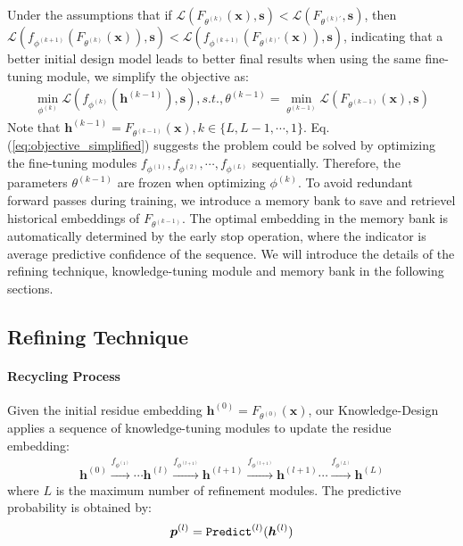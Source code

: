 \documentclass{article}
\begin{document}
Under the assumptions that if $\mathcal{L}(F_{\theta^{(k)}}(\boldsymbol{x}), \boldsymbol{s})<\mathcal{L}(F_{\theta^{(k)'}}, \boldsymbol{s})$, then $\mathcal{L}(f_{\phi^{(k+1)}}(F_{\theta^{(k)}}(\boldsymbol{x})), \boldsymbol{s})<\mathcal{L}(f_{\phi^{(k+1)}}(F_{\theta^{(k)'}}(\boldsymbol{x})), \boldsymbol{s})$, indicating that a better initial design model leads to better final results when using the same fine-tuning module, we simplify the objective as:
\begin{align}
    \min_{\phi^{(k)}} \mathcal{L}(f_{\phi^{(k)}}(\boldsymbol{h}^{(k-1)}), \boldsymbol{s}), s.t., \theta^{(k-1)} = \min_{\theta^{(k-1)}} \mathcal{L}(F_{\theta^{(k-1)}}(\boldsymbol{x}), \boldsymbol{s})
    \label{eq:objective_simplified}
\end{align}
Note that $\boldsymbol{h}^{(k-1)} = F_{\theta^{(k-1)}}(\boldsymbol{x}),  k \in \{L, L-1, \cdots, 1\}$. Eq.(\ref{eq:objective_simplified}) suggests the problem could be solved by optimizing the fine-tuning modules $f_{\phi^{(1)}}, f_{\phi^{(2)}}, \cdots, f_{\phi^{(L)}}$ sequentially. Therefore, the parameters $\theta^{(k-1)}$ are frozen when optimizing $\phi^{(k)}$. To avoid redundant forward passes during training, we introduce a memory bank to save and retrievel historical embeddings of $F_{\theta^{(k-1)}}$. The optimal embedding in the memory bank is automatically determined by the early stop operation, where the indicator is average predictive confidence of the sequence. We will introduce the details of the refining technique, knowledge-tuning module and memory bank in the following sections.







\subsection{Refining Technique}
\label{sec:recycling}
\paragraph{Recycling Process} Given the initial residue embedding $\boldsymbol{h}^{(0)} = F_{\theta^{(0)}}(\boldsymbol{x})$, our Knowledge-Design applies a sequence of knowledge-tuning modules to update the residue embedding:
\begin{align}
    \boldsymbol{h}^{(0)} \xrightarrow{f_{\phi^{(1)}}} \cdots \boldsymbol{h}^{(l)} \xrightarrow{f_{\phi^{(l+1)}}} \boldsymbol{h}^{(l+1)} \xrightarrow{f_{\phi^{(l+1)}}} \boldsymbol{h}^{(l+1)} \cdots \xrightarrow{f_{\phi^{(L)}}} \boldsymbol{h}^{(L)}
\end{align}
where $L$ is the maximum number of refinement modules. The predictive probability is obtained by:
\begin{equation}
    \boldsymbol{p}^{(l)} = \texttt{Predict}^{(l)}(\boldsymbol{h}^{(l)})\\
\end{equation}
\end{document}
